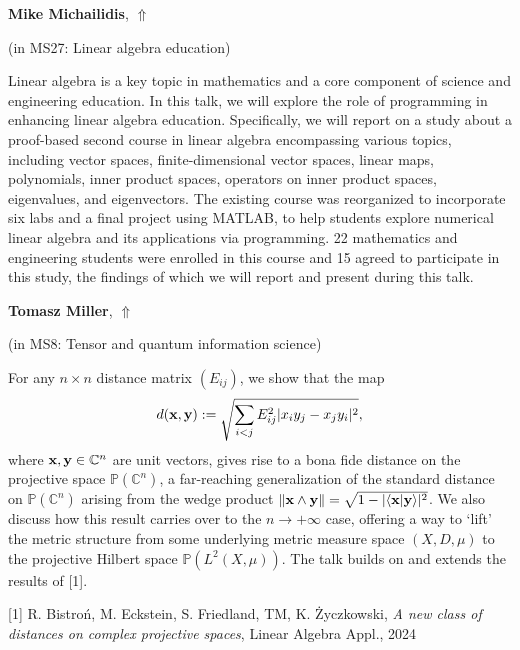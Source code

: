 \documentclass[ILAS2025-program.tex]{subfiles}
\begin{document}
     \hypertarget{down0292}{}\begin{ilasabstract}
    
    \textbf{Mike Michailidis},  \hfill \hyperlink{up0292}{$\Uparrow$}
    
    (in {\color{mstitle}MS27: Linear algebra education})
        
        \mtskip
    Linear algebra is a key topic in mathematics and a core component of science and engineering education. In this talk, we will explore the role of programming in enhancing linear algebra education. Specifically, we will report on a study about a proof-based second course in linear algebra encompassing various topics, including vector spaces, finite-dimensional vector spaces, linear maps, polynomials, inner product spaces, operators on inner product spaces, eigenvalues, and eigenvectors. The existing course was reorganized to incorporate six labs and a final project using MATLAB, to help students explore numerical linear algebra and its applications via programming. 22 mathematics and engineering students were enrolled in this course and 15 agreed to participate in this study, the findings of which we will report and present during this talk. 
\end{ilasabstract}
     \hypertarget{down0019}{}\begin{ilasabstract}
    
    \textbf{Tomasz Miller},  \hfill \hyperlink{up0019}{$\Uparrow$}
    
    (in {\color{mstitle}MS8: Tensor and quantum information science})
        
        \mtskip
    For any $n \times n$ distance matrix $(E_{ij})$, we show that the map
\begin{align*}
d(\textup{\textbf{x}},\textup{\textbf{y}}) := \sqrt{\sum_{i<j}E_{ij}^2|x_iy_j - x_jy_i|^2},
\end{align*}
where $\textup{\textbf{x}},\textup{\textbf{y}} \in {\mathbb C}^n$ are unit vectors, gives rise to a bona fide distance on the projective space ${\mathbb P}({\mathbb C}^n)$, a far-reaching generalization of the standard distance on ${\mathbb P}({\mathbb C}^n)$ arising from the wedge product $\|\textup{\textbf{x}} \wedge \textup{\textbf{y}}\| = \sqrt{1 - |\langle \textup{\textbf{x}} | \textup{\textbf{y}} \rangle|^2}$. We also discuss how this result carries over to the $n \rightarrow +\infty$ case, offering a way to `lift' the metric structure from some underlying metric measure space $(X,D,\mu)$ to the projective Hilbert space ${\mathbb P}(L^2(X,\mu))$. The talk builds on and extends the results of [1].

[1] R. Bistro\'{n}, M. Eckstein, S. Friedland, TM, K. \.{Z}yczkowski, \textit{A new class of distances on complex projective spaces}, Linear Algebra Appl., 2024\end{ilasabstract}
\end{document}
